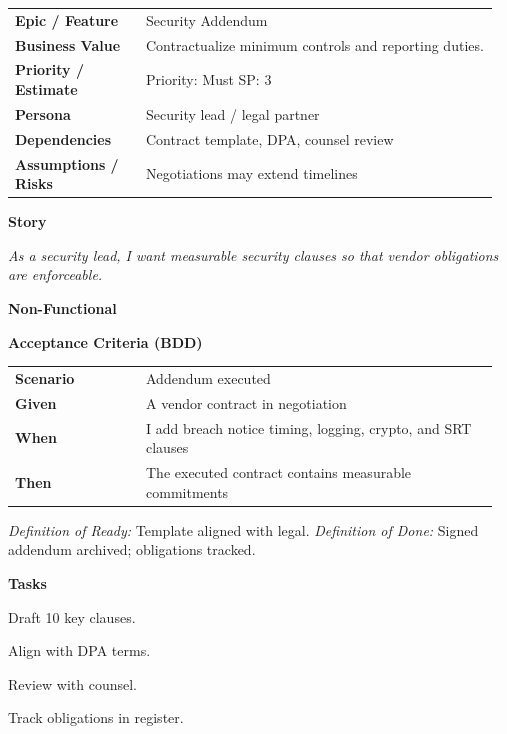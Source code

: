 \documentclass[11pt,letterpaper]{article}
\makeatletter
\newenvironment{kvtable}{%
  \par\noindent\begin{tabular}{@{}>{\raggedright\bfseries\arraybackslash}p{0.26\linewidth} >{\raggedright\arraybackslash}p{0.70\linewidth}@{}}
}{\end{tabular}\par}
\newenvironment{bdd}{%
  \par\noindent\begin{tabular}{@{}>{\raggedright\bfseries\arraybackslash}p{0.26\linewidth} >{\raggedright\arraybackslash}p{0.70\linewidth}@{}}
}{\end{tabular}\par}
\newcommand{\DoRDoD}[2]{%
  \vspace{0.35em}
  {\footnotesize\color{Muted}%
    \textit{Definition of Ready:} #1 \; \textbullet\;
    \textit{Definition of Done:} #2%
  }%
}
\newenvironment{storycard}[2]{%
  \begin{tcolorbox}[cloudcard, title={#1 --- #2}]%
}{\end{tcolorbox}}
\newcommand{\sectionlabel}[1]{\par\vspace{0.35em}\textbf{#1}\par}
\makeatother
\begin{document}
\begin{storycard}{CCS-19}{Ch. 19 — Negotiating Security Requirements}
\begin{kvtable}
Epic / Feature & Security Addendum\\
Business Value & Contractualize minimum controls and reporting duties.\\
Priority / Estimate & Priority: Must \quad SP: 3\\
Persona & Security lead / legal partner\\
Dependencies & Contract template, DPA, counsel review\\
Assumptions / Risks & Negotiations may extend timelines\\
\end{kvtable}
\sectionlabel{Story}
\textit{As a security lead, I want measurable security clauses so that vendor obligations are enforceable.}
\sectionlabel{Non-Functional}\;
\sectionlabel{Acceptance Criteria (BDD)}
\begin{bdd}
Scenario & Addendum executed\\
Given & A vendor contract in negotiation\\
When & I add breach notice timing, logging, crypto, and SRT clauses\\
Then & The executed contract contains measurable commitments\\
\end{bdd}
\DoRDoD{Template aligned with legal.}{Signed addendum archived; obligations tracked.}
\sectionlabel{Tasks}
\begin{checklist}
\item Draft 10 key clauses.
\item Align with DPA terms.
\item Review with counsel.
\item Track obligations in register.
\end{checklist}
\end{storycard}
\end{document}
